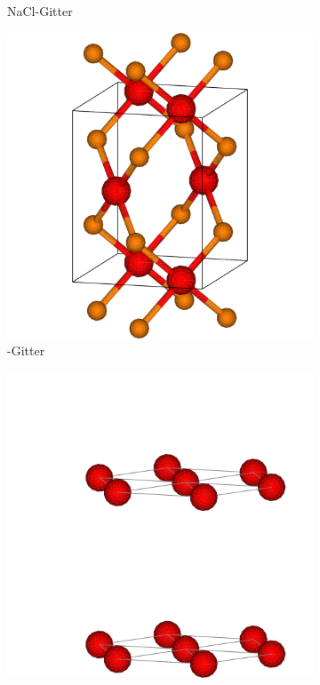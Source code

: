 \begin{figure}
\begin{subfigure}[t]{0.3\textwidth}
        \caption{NaCl-Gitter} \label{nacl}
    \end{subfigure}
    \begin{subfigure}[t]{0.3\textwidth}
        \centering
        \includegraphics[width=\textwidth]{../assets/theorie/CuO.pdf}
        \caption{-Gitter} \label{cuo}
    \end{subfigure}
    \begin{subfigure}[t]{0.3\textwidth}
        \centering
        \includegraphics[width=\textwidth]{../assets/theorie/hex.pdf}

\end{subfigure}
\end{figure}
